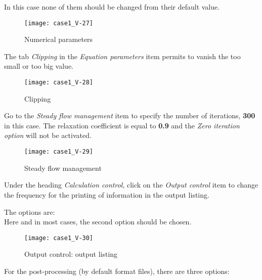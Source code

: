 In this case none of them should be changed from their default value.

\begin{figure}[!h]
\begin{center}
\texttt{[image: case1\_V-27]}
\caption{Numerical parameters}
\label{fig3738_e1}
\end{center}
\end{figure}
\clearpage
The tab {\itshape Clipping} in the {\itshape Equation parameters} item permits
to vanish the too small or too big value.
\begin{figure}[!h]
\begin{center}
\texttt{[image: case1\_V-28]}
\caption{Clipping}
\label{fig3738_e1}
\end{center}
\end{figure}
\clearpage
Go to the {\itshape Steady flow management} item to specify the number of
iterations, {\bf 300} in this case. The relaxation coefficient is equal to {\bf 0.9} and
the {\itshape Zero iteration option} will not be activated.

\begin{figure}[ht]
\begin{center}
\texttt{[image: case1\_V-29]}
\caption{Steady flow management}
\label{fig32_e1}
\end{center}
\end{figure}
\clearpage
Under the heading {\itshape Calculation control}, click on the {\itshape Output control}
item to change the frequency for the printing of information in the output listing.

The options are:\\
Here and in most cases, the second option should be chosen.

\begin{figure}[ht]
\begin{center}
\texttt{[image: case1\_V-30]}
\caption{Output control: output listing}
\label{fig33_e1}
\end{center}
\end{figure}


\clearpage
For the post-processing (by default \ensight format files), there are three options:\\

